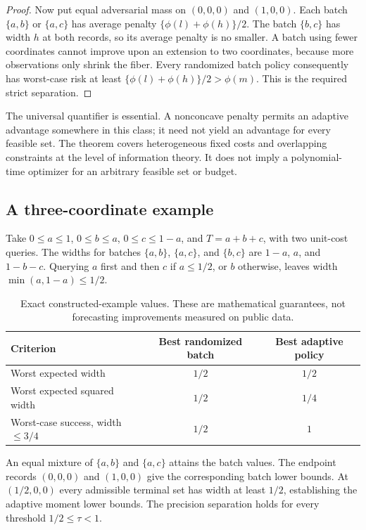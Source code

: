 \begin{proof}
Now put equal adversarial mass on $(0,0,0)$ and $(1,0,0)$.
Each batch $\{a,b\}$ or $\{a,c\}$ has average penalty
$\{\phi(l)+\phi(h)\}/2$. The batch $\{b,c\}$ has width $h$ at both
records, so its average penalty is no smaller. A batch using fewer
coordinates cannot improve upon an extension to two coordinates,
because more observations only shrink the fiber. Every randomized
batch policy consequently has worst-case risk at least
$\{\phi(l)+\phi(h)\}/2>\phi(m)$. This is the required strict separation.
\end{proof}

The universal quantifier is essential. A nonconcave penalty permits an
adaptive advantage somewhere in this class; it need not yield an
advantage for every feasible set. The theorem covers heterogeneous fixed
costs and overlapping constraints at the level of information theory.
It does not imply a polynomial-time optimizer for an arbitrary feasible
set or budget.

\subsection{A three-coordinate example}
\label{sec:risk_small_example}
Take $0\le a\le1$, $0\le b\le a$, $0\le c\le1-a$, and
$T=a+b+c$, with two unit-cost queries. The widths for batches
$\{a,b\}$, $\{a,c\}$, and $\{b,c\}$ are $1-a$, $a$, and $1-b-c$.
Querying $a$ first and then $c$ if $a\le1/2$, or $b$ otherwise, leaves
width $\min(a,1-a)\le1/2$.

\begin{table}[htbp]
\centering
\caption{Exact constructed-example values. These are mathematical
guarantees, not forecasting improvements measured on public data.}
\label{tab:risk_three_coordinate}
\begin{tabular}{lcc}
\toprule
Criterion & Best randomized batch & Best adaptive policy\\
\midrule
Worst expected width & $1/2$ & $1/2$\\
Worst expected squared width & $1/2$ & $1/4$\\
Worst-case success, width $\le3/4$ & $1/2$ & $1$\\
\bottomrule
\end{tabular}
\end{table}

An equal mixture of $\{a,b\}$ and $\{a,c\}$ attains the batch values.
The endpoint records $(0,0,0)$ and $(1,0,0)$ give the corresponding
batch lower bounds. At $(1/2,0,0)$ every admissible terminal set has
width at least $1/2$, establishing the adaptive moment lower bounds.
The precision separation holds for every threshold $1/2\le\tau<1$.

